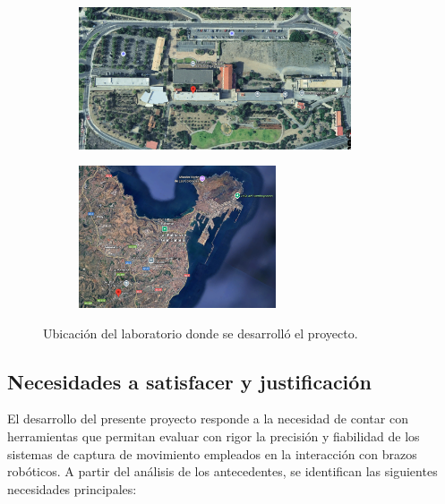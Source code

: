 \documentclass[12pt,a4paper,oneside]{report}
\begin{document}
\begin{figure}[h]
  \begin{subfigure}[b]{0,4\textwidth}
    \centering
    \includegraphics[height=4.2cm,keepaspectratio]{figuras/ubicacionCampus.png}
    \label{fig:UbicacionCampus}  
  \end{subfigure}
  \hfill
  \begin{subfigure}[b]{0,4\textwidth}
    \centering
    \includegraphics[height=4.2cm,keepaspectratio]{figuras/ubicacionLP.png}
    \label{fig:UbicacionLP}   
  \end{subfigure}
\caption{Ubicación del laboratorio donde se desarrolló el proyecto.}
\label{fig:UbicacionLaboratorio}
\end{figure}

\subsection{Necesidades a satisfacer y justificación}

El desarrollo del presente proyecto responde a la necesidad de contar con
herramientas que permitan evaluar con rigor la precisión y fiabilidad de los
sistemas de captura de movimiento empleados en la interacción con brazos
robóticos. A partir del análisis de los antecedentes, se identifican las
siguientes necesidades principales:
\end{document}
